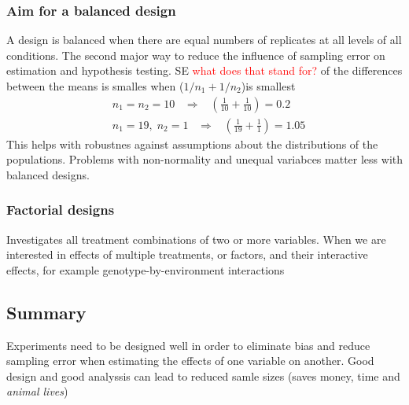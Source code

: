 \documentclass{article}
\begin{document}
\subsubsection{Aim for a balanced design}
A design is balanced when there are equal numbers of replicates at all levels of all conditions. The second major way to reduce the influence of sampling error on estimation and hypothesis testing. SE \textcolor{red}{what does that stand for?} of the differences between the means is smalles when ($1/n_1 + 1/n_2$)is smallest
\begin{equation*}
\begin{split}
& n_1 = n_2 = 10 \;\;\; \Rightarrow \;\;\; ( \frac{1}{10} +\frac{1}{10} ) = 0.2 \\
& n_1 = 19,\; n_2 = 1 \;\;\; \Rightarrow \;\;\;(\frac{1}{19} + \frac{1}{1})= 1.05
\end{split}
\end{equation*}
This helps with robustnes against assumptions about the distributions of the populations. Problems with non-normality and unequal variabces matter less with balanced designs.


\subsubsection{Factorial designs}
Investigates all treatment combinations of two or more variables. When we are interested in effects of multiple treatments, or factors, and their interactive effects, for example genotype-by-environment interactions

\subsection{Summary}
Experiments need to be designed well in order to eliminate bias and reduce sampling error when estimating the effects of one variable on another. Good design and good analyssis can lead to reduced samle sizes (saves money, time and \textit{animal lives})
\end{document}
